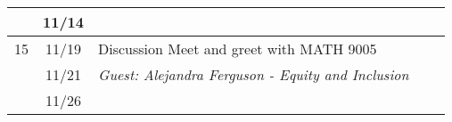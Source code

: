 \begin{longtable}{ |c|c|p{10em}|p{10em}|p{10em}| }
     & 11/14 & {}
             & 
             & \\ \hline

     
  15 & 11/19 & {Discussion Meet and greet with MATH 9005} 
             & 
             & \\ \hline

     & 11/21 & \textit{Guest: Alejandra Ferguson - Equity and Inclusion} %
             & 
             & \\ \hline

     & 11/26 &  {}   
             & 
             & \\ \hline
\end{longtable}

